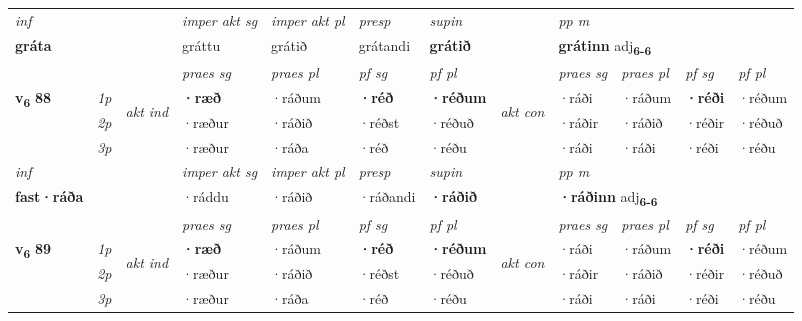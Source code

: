 \begin{longtable}[l]{X>{\footnotesize\itshape}llXXXXlXXXX}
   {\textit{inf}} & &  & \textit{imper akt sg} & \textit{imper akt pl}   & \textit{presp} & \textit{supin}  && \textit{pp m} \\*
  {\textbf{gráta}} & && gráttu  & grátið   & grátandi &  \textbf{grátið}  && \multicolumn{2}{l}{\textbf{grátinn} adj\textbf{\textsubscript{6-6}}} \\*

\midrule

 & &   & \textit{praes sg}  & \textit{praes pl}    & \textit{ pf sg} & \textit{pf pl} & & \textit{praes sg}  & \textit{praes pl}    & \textit{pf sg} & \textit{pf pl }  \\ \cmidrule{4-7} \cmidrule{9-12}
 \multirow{2}{*}{{{\textbf{v{\textsubscript{6}}} \Large{\textbf{88}}}}}  & 1p & \multirow{3}{*}{\begin{turn}{90}\textit{akt ind}\end{turn}} & \textbf{·ræð} & ·ráðum & \textbf{·réð} & \textbf{·réðum} & \multirow{3}{*}{\begin{turn}{90}\textit{akt con}\end{turn}} &·ráði & ·ráðum & \textbf{·réði} & ·réðum\\*
 & 2p &  &  ·ræður  & ·ráðið & ·réðst & ·réðuð & & ·ráðir & ·ráðið & ·réðir & ·réðuð \\*
 & 3p &  & ·ræður & ·ráða & ·réð & ·réðu & & ·ráði & ·ráði& ·réði & ·réðu \\*
\cmidrule{4-7} \cmidrule{9-12}

   {\textit{inf}} & &  & \textit{imper akt sg} & \textit{imper akt pl}   & \textit{presp} & \textit{supin}  && \textit{pp m} \\*
  {\textbf{fast\allowbreak ·ráða}} & && ·ráddu  & ·ráðið   & ·ráðandi &  \textbf{·ráðið}  && \multicolumn{2}{l}{\textbf{·ráðinn} adj\textbf{\textsubscript{6-6}}} \\*

\midrule

 & &   & \textit{praes sg}  & \textit{praes pl}    & \textit{ pf sg} & \textit{pf pl} & & \textit{praes sg}  & \textit{praes pl}    & \textit{pf sg} & \textit{pf pl }  \\ \cmidrule{4-7} \cmidrule{9-12}
 \multirow{2}{*}{{{\textbf{v{\textsubscript{6}}} \Large{\textbf{89}}}}}  & 1p & \multirow{3}{*}{\begin{turn}{90}\textit{akt ind}\end{turn}} & \textbf{·ræð} & ·ráðum & \textbf{·réð} & \textbf{·réðum} & \multirow{3}{*}{\begin{turn}{90}\textit{akt con}\end{turn}} &·ráði & ·ráðum & \textbf{·réði} & ·réðum\\*
 & 2p &  &  ·ræður  & ·ráðið & ·réðst & ·réðuð & & ·ráðir & ·ráðið & ·réðir & ·réðuð \\*
 & 3p &  & ·ræður & ·ráða & ·réð & ·réðu & & ·ráði & ·ráði& ·réði & ·réðu \\*
\cmidrule{4-7} \cmidrule{9-12}


\end{longtable}
